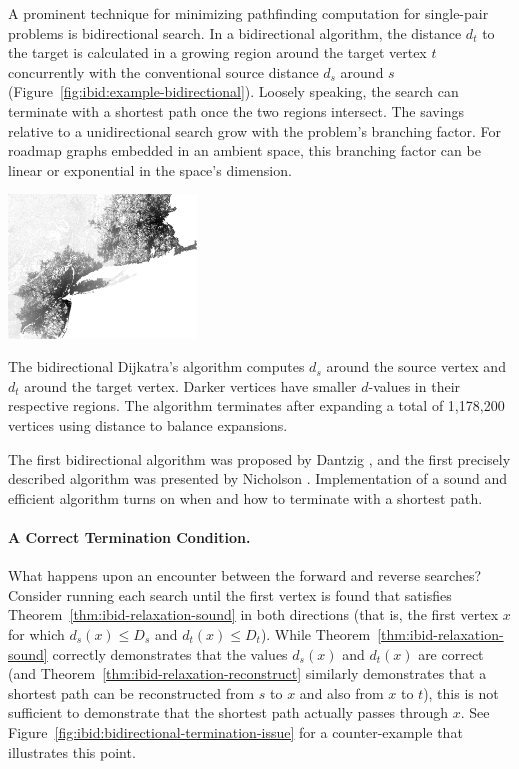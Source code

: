 A prominent technique for minimizing pathfinding computation for
single-pair problems
is bidirectional search.
In a bidirectional algorithm,
the distance $d_t$ to the target is calculated in a growing region
around the target vertex $t$
concurrently with the conventional source distance $d_s$ around $s$
(Figure~\ref{fig:ibid:example-bidirectional}).
Loosely speaking,
the search can terminate with a shortest path
once the two regions intersect.
The savings relative to a unidirectional search grow with the problem's
branching factor.
For roadmap graphs embedded in an ambient space,
this branching factor can be linear or exponential in the space's
dimension.
\begin{marginfigure}%
   \centering%
   \includegraphics[width=5cm]{figs/incbi-road-ne/singleshot/example-bidijkstra.png}%
   \caption{The bidirectional Dijkatra's algorithm
      computes $d_s$ around the source vertex
      and $d_t$ around the target vertex.
      Darker vertices have smaller $d$-values in their respective
      regions.
      The algorithm terminates after expanding a total of
      1,178,200 vertices using distance to balance expansions.}%
   \label{fig:ibid:example-bidirectional}%
\end{marginfigure}

The first bidirectional algorithm
was proposed by Dantzig \citep{dantzig1963linearprogramming},
and the first precisely described algorithm was presented by
Nicholson \citep{nicholson1966shortest}.
Implementation of a sound and efficient algorithm
turns on when and how to terminate with a shortest path.

\paragraph{A Correct Termination Condition.}
What happens upon an encounter between the forward and reverse searches?
Consider running each search until the first vertex is found
that satisfies Theorem~\ref{thm:ibid-relaxation-sound} in both
directions
(that is, the first vertex $x$ for which
$d_s(x) \leq D_s$ and $d_t(x) \leq D_t$).
While Theorem~\ref{thm:ibid-relaxation-sound} correctly demonstrates
that the values $d_s(x)$ and $d_t(x)$ are correct
(and Theorem~\ref{thm:ibid-relaxation-reconstruct} similarly
demonstrates that a shortest path can be reconstructed from $s$ to $x$
and also from $x$ to $t$),
this is not sufficient to demonstrate that the shortest path
actually passes through $x$.
See Figure~\ref{fig:ibid:bidirectional-termination-issue} for a
counter-example that illustrates this point.

